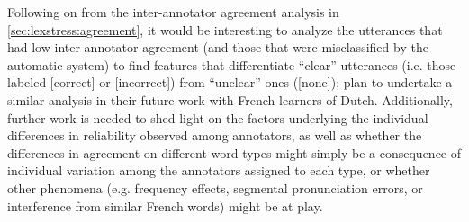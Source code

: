 
Following on from the inter-annotator agreement analysis in \cref{sec:lexstress:agreement}, it would be interesting to analyze the utterances that had low inter-annotator agreement (and those that were misclassified by the automatic system) to find features that differentiate ``clear'' utterances (i.e. those labeled [correct] or [incorrect]) from ``unclear'' ones ([none]); \textcite{Michaux2013} plan to undertake a similar analysis in their future work with French learners of Dutch. Additionally, further work is needed to shed light on the factors underlying the individual differences in reliability observed among annotators, as well as whether the differences in agreement on different word types might simply be a consequence of individual variation among the annotators assigned to each type, or whether other phenomena (e.g. frequency effects, segmental pronunciation errors, or interference from similar French words) might be at play.





	



